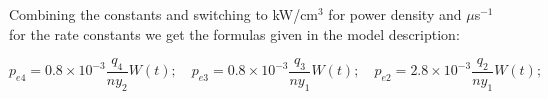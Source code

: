 \documentclass{report}
\begin{document}
\begin{appendices}
Combining the constants and switching to kW/cm$^3$ for power density and {$\mu$s$^{-1}$} for the rate constants we get the formulas given in the model description:

\begin{equation*}
p_{e4} = 0.8\times 10^{-3} \frac{q_4}{n y_2} W(t);\quad p_{e3} = 0.8\times 10^{-3}\frac{q_3}{n y_1} W(t);\quad p_{e2} = 2.8\times 10^{-3}\frac{q_2}{n y_1} W(t);
\end{equation*}







\end{appendices}



                          

\printbibliography
                          
\end{document}

